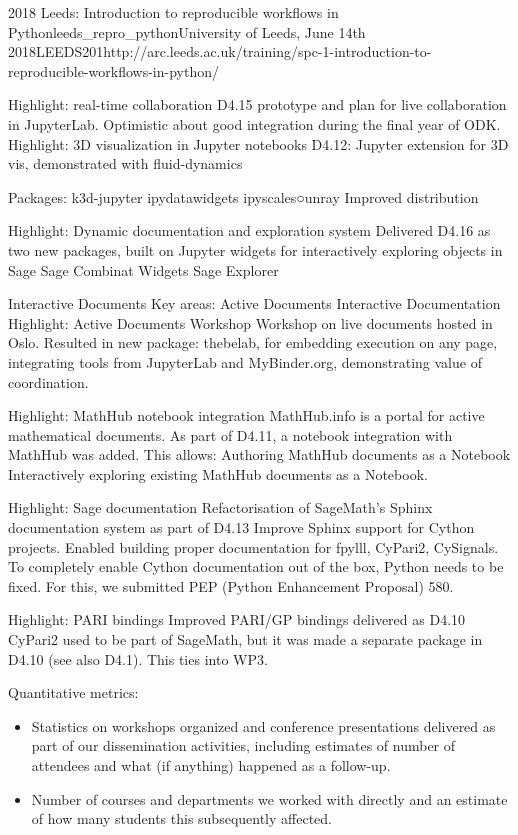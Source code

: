 \begin{Aim 1}
\begin{Aim 2}
\begin{event}{2018 Leeds: Introduction to reproducible workflows in Python}{leeds_repro_python}{University of Leeds, June 14th 2018}{LEEDS}{20}{1}{http://arc.leeds.ac.uk/training/spc-1-introduction-to-reproducible-workflows-in-python/}
\begin{itemize}
Highlight: real-time collaboration
D4.15 prototype and plan for live collaboration in JupyterLab. Optimistic about good integration during the final year of ODK.
Highlight: 3D visualization in Jupyter notebooks D4.12: Jupyter extension for 3D vis, demonstrated with fluid-dynamics

Packages:
k3d-jupyter
ipydatawidgets
ipyscales○unray
Improved distribution

Highlight: Dynamic documentation and exploration system
Delivered D4.16 as two new packages, built on Jupyter widgets for interactively exploring objects in Sage
Sage Combinat Widgets
Sage Explorer

Interactive Documents Key areas:
Active Documents
Interactive Documentation
Highlight: Active Documents Workshop
Workshop on live documents hosted in Oslo. Resulted in new package: 
thebelab, for embedding execution on any page, integrating tools from JupyterLab and MyBinder.org, demonstrating value of coordination.

Highlight: MathHub notebook integration
MathHub.info is a portal for active mathematical documents. As part of D4.11, a notebook integration with MathHub was added. This allows:
Authoring MathHub documents as a Notebook Interactively exploring existing MathHub documents as a Notebook.

Highlight: Sage documentation
Refactorisation of SageMath’s Sphinx documentation system as part of D4.13
Improve Sphinx support for Cython projects.
Enabled building proper documentation for fpylll, CyPari2, CySignals.
To completely enable Cython documentation out of the box, Python needs to be fixed. For this, we submitted PEP (Python Enhancement Proposal) 580.

Highlight: PARI bindings
Improved PARI/GP bindings delivered as D4.10
CyPari2 used to be part of SageMath, but it was made a separate package in 
D4.10 (see also D4.1). This ties into WP3.


Quantitative metrics:
\begin{itemize}
\item Statistics on workshops organized and conference presentations
  delivered as part of our dissemination activities, including
  estimates of number of attendees and what (if anything) happened as
  a follow-up.
\item Number of courses and departments we worked with directly and an
  estimate of how many students this subsequently affected.


\end{itemize}
\end{itemize}
\end{event}
\end{Aim 2}
\end{Aim 1}
